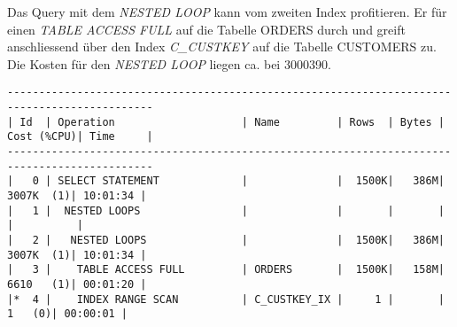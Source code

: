 \documentclass[11pt,a4paper,parskip=half]{scrartcl}
\begin{document}
Das Query mit dem \emph{NESTED LOOP} kann vom zweiten Index profitieren. Er für einen \emph{TABLE ACCESS FULL} auf die Tabelle ORDERS durch und greift anschliessend über den Index \emph{C\_CUSTKEY} auf die Tabelle CUSTOMERS zu. Die Kosten für den \emph{NESTED LOOP} liegen ca. bei 3000390.
\begin{lstlisting}
---------------------------------------------------------------------------------------------                                                                                                                                                                                                                
| Id  | Operation                    | Name         | Rows  | Bytes | Cost (%CPU)| Time     |                                                                                                                                                                                                                
---------------------------------------------------------------------------------------------                                                                                                                                                                                                                
|   0 | SELECT STATEMENT             |              |  1500K|   386M|  3007K  (1)| 10:01:34 |                                                                                                                                                                                                                
|   1 |  NESTED LOOPS                |              |       |       |            |          |                                                                                                                                                                                                                
|   2 |   NESTED LOOPS               |              |  1500K|   386M|  3007K  (1)| 10:01:34 |                                                                                                                                                                                                                
|   3 |    TABLE ACCESS FULL         | ORDERS       |  1500K|   158M|  6610   (1)| 00:01:20 |                                                                                                                                                                                                                
|*  4 |    INDEX RANGE SCAN          | C_CUSTKEY_IX |     1 |       |     1   (0)| 00:00:01 |                                                                                                                                                                                                                

\end{lstlisting}
\end{document}
